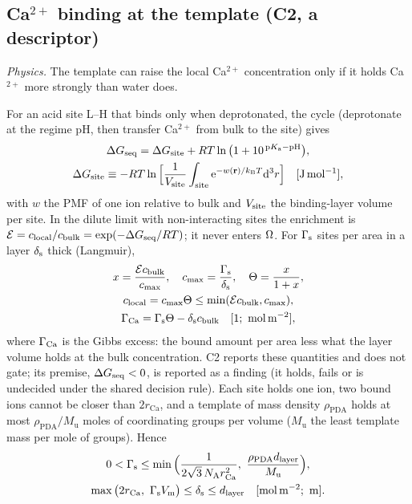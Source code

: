 \subsection{Ca$^{2+}$ binding at the template (C2, a descriptor)}\label{thsi:sec:binding}

\textit{Physics.} The template can raise the local Ca$^{2+}$ concentration only if it holds Ca$^{2+}$
more strongly than water does.

For an acid site L--H that binds only when deprotonated, the cycle (deprotonate at the regime pH, then
transfer Ca$^{2+}$ from bulk to the site) gives
\begin{equation}\label{thsi:eq:cycle}
\begin{gathered}
\Delta G_\mathrm{seq}=\Delta G_\mathrm{site}+R T\ln\big(1+10^{\,\mathrm{p}K_\mathrm{a}-\mathrm{pH}}\big),\\
\Delta G_\mathrm{site}\equiv-R T\ln\Big[\frac{1}{V_\mathrm{site}}\int_\mathrm{site}\mathrm{e}^{-w(\mathbf r)/k_\mathrm{B} T}\mathrm{d}^{3}r\Big] \quad[\mathrm{J\,mol^{-1}}],
\end{gathered}
\end{equation}
with $w$ the PMF of one ion relative to bulk and $V_\mathrm{site}$ the binding-layer volume per site. In the
dilute limit with non-interacting sites the enrichment is $\mathcal{E}=c_\mathrm{local}/c_\mathrm{bulk}=\exp(-\Delta G_\mathrm{seq}/R T)$; it never
enters $\Omega$. For $\Gamma_\mathrm{s}$ sites per area in a layer $\delta_\mathrm{s}$ thick (Langmuir),
\begin{equation}\label{thsi:eq:langmuir}
\begin{gathered}
x=\frac{\mathcal{E}c_\mathrm{bulk}}{c_\mathrm{max}},\quad c_\mathrm{max}=\frac{\Gamma_\mathrm{s}}{\delta_\mathrm{s}},\quad \Theta=\frac{x}{1+x},\\
c_\mathrm{local}=c_\mathrm{max}\Theta\le\min(\mathcal{E}c_\mathrm{bulk},c_\mathrm{max}),\\
\Gamma_\mathrm{Ca}=\Gamma_\mathrm{s}\Theta-\delta_\mathrm{s}c_\mathrm{bulk} \quad[\mathrm{1;\ mol\,m^{-2}}],
\end{gathered}
\end{equation}
where $\Gamma_\mathrm{Ca}$ is the Gibbs excess: the bound amount per area less what the layer volume holds at the bulk
concentration. C2 reports these quantities and does not gate; its premise, $\Delta G_\mathrm{seq}<0$, is reported as a
finding (it holds, fails or is undecided under the shared decision rule). Each site holds one ion, two
bound ions cannot be closer than $2r_\mathrm{Ca}$, and a template of mass density $\rho_\mathrm{PDA}$ holds
at most $\rho_\mathrm{PDA}/M_\mathrm{u}$ moles of coordinating groups per volume ($M_\mathrm{u}$ the least
template mass per mole of groups). Hence
\begin{equation}\label{thsi:eq:gamma-bound}
\begin{gathered}
0<\Gs\le\min\Big(\frac{1}{2\sqrt3\,\NA r_\mathrm{Ca}^{2}},\ \frac{\rho_\mathrm{PDA}d_\mathrm{layer}}{M_\mathrm{u}}\Big),\\
\max\big(2r_\mathrm{Ca},\ \Gs\Vm\big)\le\ds\le d_\mathrm{layer} \un{mol\,m^{-2};\ m}.
\end{gathered}
\end{equation}
